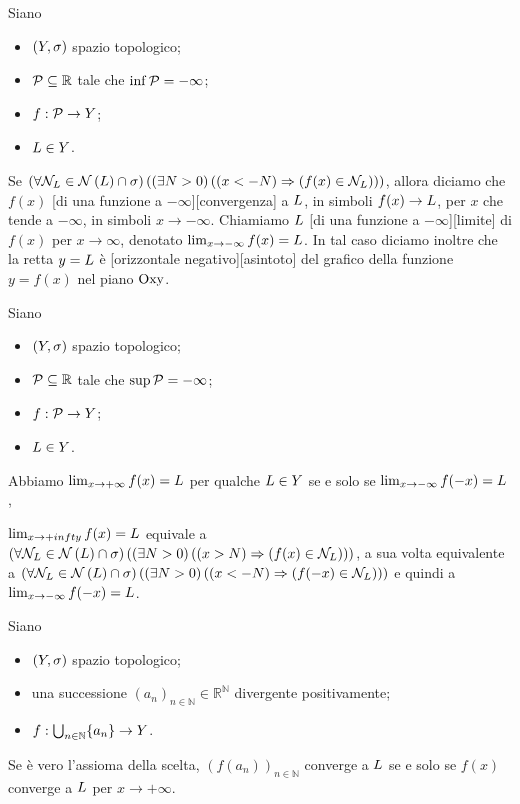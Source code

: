 \begin{Definition}
	Siano
	\begin{itemize}
		\item $(Y,\sigma)$ spazio topologico;
		\item $\mathcal{P} \subseteq \mathbb{R}$ tale che $\inf{\mathcal{P}} = - \infty$;
		\item $f: \mathcal{P} \rightarrow Y$;
		\item $L \in Y$.
	\end{itemize}
	Se $\ForAll{\Neighborhood_\Limit \in \Neighborhoods{\Limit} \cap \VarTopology}{\Exists{N > 0}{\Implies{x < -N}{f(x) \in \Neighborhood_\Limit}}}$, allora diciamo che $f(x)$ [di una funzione a $-\infty$][convergenza] a $L$, in simboli $f(x) \rightarrow L$, per $x$ che tende a $-\infty$, in simboli $x \rightarrow -\infty$. Chiamiamo $L$ [di una funzione a $-\infty$][limite] di $f(x)$ per $x \rightarrow \infty$, denotato $\lim_{x \rightarrow -\infty} f(x) = L$. In tal caso diciamo inoltre che la retta $y = L$ \`e [orizzontale negativo][asintoto] del grafico della funzione $y = f(x)$ nel piano $\text{Oxy}$.
\end{Definition}
\begin{Theorem}
	Siano
	\begin{itemize}
		\item $(Y,\sigma)$ spazio topologico;
		\item $\mathcal{P} \subseteq \mathbb{R}$ tale che $\sup{\mathcal{P}} = - \infty$;
		\item $f: \mathcal{P} \rightarrow Y$;
		\item $L \in Y$.
	\end{itemize}
	Abbiamo $\lim_{x \rightarrow +\infty} f(x) = L$ per qualche $L \in Y$ se e solo se $\lim_{x \rightarrow -\infty} f(-x) = L$,
\end{Theorem}
\Proof $\lim_{x \rightarrow +infty} f(x) = L$ equivale a $\ForAll{\Neighborhood_\Limit \in \Neighborhoods{\Limit} \cap \VarTopology}{\Exists{N > 0}{\Implies{x > N}{f(x) \in \Neighborhood_\Limit}}}$, a sua volta equivalente a $\ForAll{\Neighborhood_\Limit \in \Neighborhoods{\Limit} \cap \VarTopology}{\Exists{N > 0}{\Implies{x < - N}{f(-x) \in \Neighborhood_\Limit}}}$ e quindi a $\lim_{x \rightarrow -\infty} f(-x) = L$. \EndProof
\begin{Theorem}
	Siano
	\begin{itemize}
		\item $(Y,\sigma)$ spazio topologico;
		\item una successione $(a_n)_{n \in \mathbb{N}} \in \mathbb{R}^\mathbb{N}$ divergente positivamente;
		\item $f: \bigcup_{n \in \mathbb{N}} \lbrace a_n \rbrace \rightarrow Y$.
	\end{itemize}
	Se \`e vero l'assioma della scelta, $(f(a_n))_{n \in \mathbb{N}}$ converge a $L$ se e solo se $f(x)$ converge a $L$ per $x \rightarrow +\infty$.
\end{Theorem}

